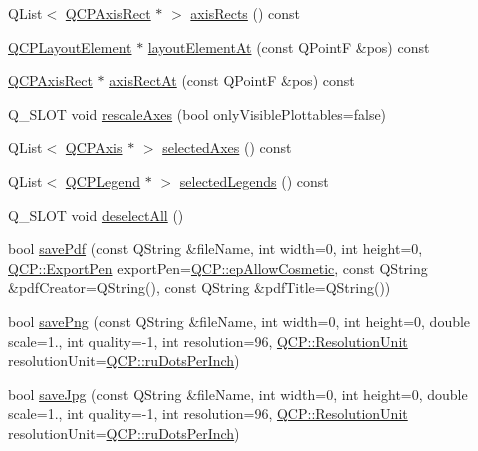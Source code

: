 \begin{DoxyCompactItemize}
\item 
Q\+List$<$ \hyperlink{class_q_c_p_axis_rect}{Q\+C\+P\+Axis\+Rect} $\ast$ $>$ \hyperlink{class_q_custom_plot_afd67094aaeccbc5719761348b2d8c891}{axis\+Rects} () const 
\item 
\hyperlink{class_q_c_p_layout_element}{Q\+C\+P\+Layout\+Element} $\ast$ \hyperlink{class_q_custom_plot_a840458186d4483c8a42d6a399448d38f}{layout\+Element\+At} (const Q\+PointF \&pos) const 
\item 
\hyperlink{class_q_c_p_axis_rect}{Q\+C\+P\+Axis\+Rect} $\ast$ \hyperlink{class_q_custom_plot_af903c081aaf7201631d3607905cc9afc}{axis\+Rect\+At} (const Q\+PointF \&pos) const 
\item 
Q\+\_\+\+S\+L\+OT void \hyperlink{class_q_custom_plot_ad86528f2cee6c7e446dea4a6e8839935}{rescale\+Axes} (bool only\+Visible\+Plottables=false)
\item 
Q\+List$<$ \hyperlink{class_q_c_p_axis}{Q\+C\+P\+Axis} $\ast$ $>$ \hyperlink{class_q_custom_plot_aa6baf867e8beb96ed5bd471f83ece903}{selected\+Axes} () const 
\item 
Q\+List$<$ \hyperlink{class_q_c_p_legend}{Q\+C\+P\+Legend} $\ast$ $>$ \hyperlink{class_q_custom_plot_a1ea6297300c3e2770e65f95836411755}{selected\+Legends} () const 
\item 
Q\+\_\+\+S\+L\+OT void \hyperlink{class_q_custom_plot_a9d4808ab925b003054085246c92a257c}{deselect\+All} ()
\item 
bool \hyperlink{class_q_custom_plot_ad5acd34f6b39c3516887d7e54fec2412}{save\+Pdf} (const Q\+String \&file\+Name, int width=0, int height=0, \hyperlink{namespace_q_c_p_a17844f19e1019693a953e1eb93536d2f}{Q\+C\+P\+::\+Export\+Pen} export\+Pen=\hyperlink{namespace_q_c_p_a17844f19e1019693a953e1eb93536d2fa50d3657dba3fb90560b93a823cb0a6e8}{Q\+C\+P\+::ep\+Allow\+Cosmetic}, const Q\+String \&pdf\+Creator=Q\+String(), const Q\+String \&pdf\+Title=Q\+String())
\item 
bool \hyperlink{class_q_custom_plot_ac92cc9256d12f354b40a4be4600b5fb9}{save\+Png} (const Q\+String \&file\+Name, int width=0, int height=0, double scale=1., int quality=-\/1, int resolution=96, \hyperlink{namespace_q_c_p_a715d46153da230990aa887d0f0602452}{Q\+C\+P\+::\+Resolution\+Unit} resolution\+Unit=\hyperlink{namespace_q_c_p_a715d46153da230990aa887d0f0602452affb887d8efe79c39a1aca2acd7002afc}{Q\+C\+P\+::ru\+Dots\+Per\+Inch})
\item 
bool \hyperlink{class_q_custom_plot_a76f0d278e630a711fa6f48048cfd83e4}{save\+Jpg} (const Q\+String \&file\+Name, int width=0, int height=0, double scale=1., int quality=-\/1, int resolution=96, \hyperlink{namespace_q_c_p_a715d46153da230990aa887d0f0602452}{Q\+C\+P\+::\+Resolution\+Unit} resolution\+Unit=\hyperlink{namespace_q_c_p_a715d46153da230990aa887d0f0602452affb887d8efe79c39a1aca2acd7002afc}{Q\+C\+P\+::ru\+Dots\+Per\+Inch})

\end{DoxyCompactItemize}
